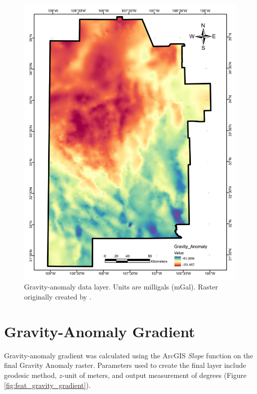 \begin{figure}[H]
\centering
\includegraphics[width=0.75\linewidth]{templates/images/Figure-GravityAnomaly.pdf}
\caption[Gravity anomaly data layer]{Gravity-anomaly data layer. Units are milligals (mGal). Raster originally created by \protect\citet{bielicki_hydrogeolgic_2015}.}
\label{fig:feat_gravity}
\end{figure}

\section{Gravity-Anomaly Gradient}\label{app:dl_grav_gradient}

Gravity-anomaly gradient was calculated using the ArcGIS \textit{Slope} function on the final Gravity Anomaly raster. Parameters used to create the final layer include geodesic method, $z$-unit of meters, and output measurement of degrees (Figure \ref{fig:feat_gravity_gradient}).

